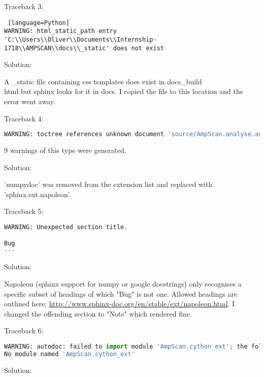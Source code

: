 \documentclass{article}
\begin{document}
Traceback 3:

\begin{lstlisting} [language=Python]
WARNING: html_static_path entry 'C:\\Users\\Oliver\\Documents\\Internship-1718\\AMPSCAN\\docs\\_static' does not exist
\end{lstlisting}

Solution:

A \_static file containing css templates does exist in docs\_build\\html but sphinx looks for it in docs. I copied the file to this location and the error went away.

Traceback 4:

\begin{lstlisting}[language=Python]
WARNING: toctree references unknown document 'source/AmpScan.analyse.analyseMixin.create_slices
\end{lstlisting}

9 warnings of this type were generated.

Solution:

'numpydoc' was removed from the extension list and replaced with 'sphinx.ext.napoleon'.

Traceback 5:

\begin{lstlisting}[language=Python]
WARNING: Unexpected section title.

Bug
---
\end{lstlisting}

Solution:

Napoleon (sphinx support for numpy or google docstrings) only recognises a specific subset of headings of which "Bug" is not one. Allowed headings are outlined here; \url{http://www.sphinx-doc.org/en/stable/ext/napoleon.html}. I changed the offending section to "Note" which rendered fine.

Traceback 6:

\begin{lstlisting}[language=Python]
WARNING: autodoc: failed to import module 'AmpScan.cython_ext'; the following exception was raised:
No module named 'AmpScan.cython_ext'
\end{lstlisting}

Solution:
\end{document}
